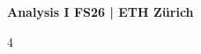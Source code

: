 \documentclass[8pt,landscape]{extarticle}
\begin{document}
{\large \textbf{Analysis I \hfill FS26 | ETH Zürich}} 

\begin{multicols*}{4}








\vfill\null
\end{multicols*}
\end{document}
